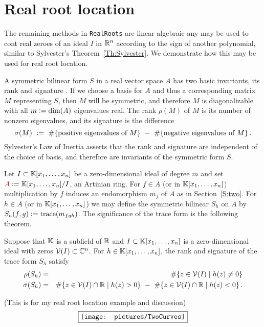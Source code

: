 \newpage
\section{Real root location}\label{S:three}
%
%
The remaining methods in  \texttt{RealRoots} are linear-algebraic any may be used to cont real zeroes of an ideal $I$ in $\mathbb{R}^n$ according to
the sign of another polynomial, similar to Sylvester's Theorem~\ref{Th:Sylvester}.
We demonstrate how this may be used for real root location.

A symmetric bilinear form $S$ in a real vector space $A$ has two basic invariants, its rank  and signature
.
If we choose a basis for $A$ and thus a corresponding matrix $M$ representing $S$, then $M$ will be symmetric, and therefore $M$ is
diagonalizable with all $m\vcentcolon = \dim(A)$ eigenvalues real.
The rank $\rho(M)$ of $M$ is its number of nonzero eigenvalues, and its signature  is the difference
\[
\sigma(M)\ \vcentcolon =\ \#\{\mbox{positive eigenvalues of $M$}\}
\ -\ \#\{\mbox{negative eigenvalues of $M$}\}\,.
\]
Sylvester's Law of Inertia asserts that the rank and signature are independent of the choice of basis, and therefore are invariants of the
symmetric form $S$.

Let $I\subset\mathbb{K}[x_1,\dotsc,x_n]$ be a zero-dimensional ideal of degree $m$ and set $\defcolor{A}\vcentcolon=\KK[x_1,\dotsc,x_n]/I$, an
Artinian ring.
For $f\in A$ (or in $\mathbb{K}[x_1,\dotsc,x_n]$) multiplication by $f$ induces an endomorphism $m_f$ of $A$ as in Section~\ref{S:two}.
For $h\in A$ (or in $\mathbb{K}[x_1,\dotsc,x_n]$) we may define the symmetric bilinear  $S_h$ on $A$ by
$S_h(f,g)\vcentcolon= \mbox{trace}(m_{fgh})$.
The significance of the trace form is the following theorem.

\begin{theorem}
  Suppose that $\mathbb{K}$ is a subfield of $\mathbb{R}$ and $I\subset\mathbb{K}[x_1,\dotsc,x_n]$ is a zero-dimensional ideal with zeros
  $\mathcal{V}(I)\subset\mathbb{C}^n$.
  For $h\in\mathbb{K}[x_1,\dotsc,x_n]$, the rank and signature of the trace form $S_h$ satisfy
  \begin{eqnarray*}
    \rho(S_h)&=&
      \#\{ z \in \calV(I) \mid h(z)\neq 0\}   \\
    \sigma(S_h)&=&
        \#\{ z \in \calV(I)\cap\RR \mid h(z)> 0\} \ -\ 
        \#\{ z \in \calV(I)\cap\RR \mid h(z)< 0\} \,.
  \end{eqnarray*}
\end{theorem}



(This is for my real root location example and discussion)
\[
\fbox{\texttt{[image: pictures/TwoCurves]}}
\]
%
%
\newpage
